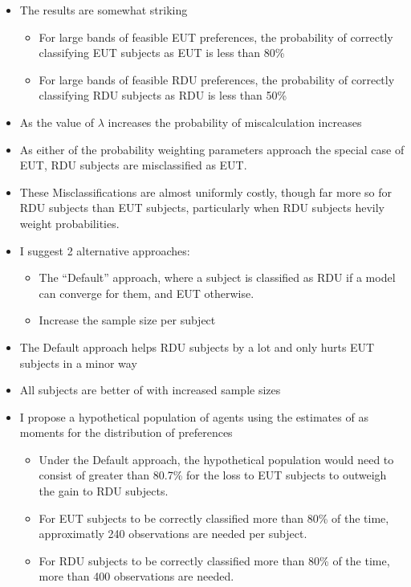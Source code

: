 \documentclass[12pt,a4paper]{article}\usepackage[]{graphicx}\usepackage[]{color}
\begin{document}
\begin{itemize}
\begin{itemize}
			\end{itemize}
		\item The results are somewhat striking
			\begin{itemize}
				\item For large bands of feasible EUT preferences, the probability of correctly classifying EUT subjects as EUT is less than 80\%
				\item For large bands of feasible RDU preferences, the probability of correctly classifying RDU subjects as RDU is less than 50\%
			\end{itemize}
		\item As the value of $\lambda$ increases the probability of miscalculation increases
		\item As either of the probability weighting parameters approach the special case of EUT, RDU subjects are misclassified as EUT.
		\item These Misclassifications are almost uniformly costly, though far more so for RDU subjects than EUT subjects, particularly when RDU subjects hevily weight probabilities.
		\item I suggest 2 alternative approaches:
			\begin{itemize}
				\item The \enquote{Default} approach, where a subject is classified as RDU if a model can converge for them, and EUT otherwise.
				\item Increase the sample size per subject
			\end{itemize}
		\item The Default approach helps RDU subjects by a lot and only hurts EUT subjects in a minor way
		\item All subjects are better of with increased sample sizes
		\item I propose a hypothetical population of agents using the estimates of \textcite{Harrison2016} as moments for the distribution of preferences
			\begin{itemize}
				\item Under the Default approach, the hypothetical population would need to consist of greater than 80.7\% for the loss to EUT subjects to outweigh the gain to RDU subjects.
				\item For EUT subjects to be correctly classified more than 80\% of the time, approximatly 240 observations are needed per subject.
				\item For RDU subjects to be correctly classified more than 80\% of the time, more than 400 observations are needed.

\end{itemize}
\end{itemize}
\end{document}
